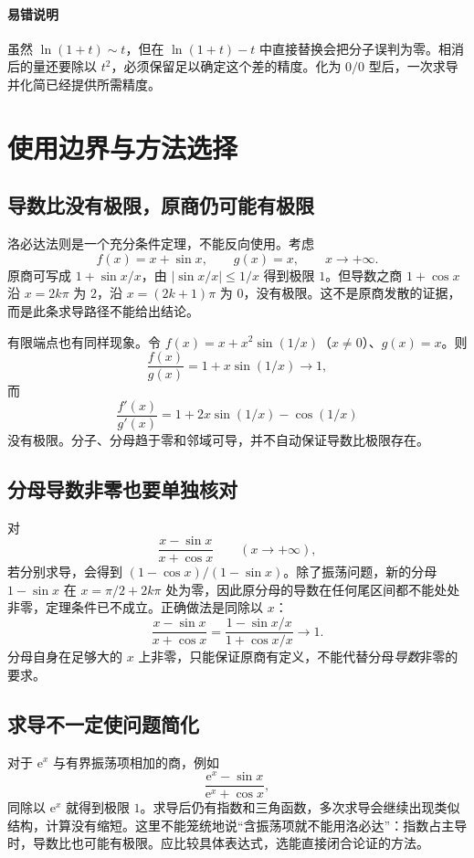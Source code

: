 \documentclass[UTF8,fontset=fandol,12pt,oneside,openany]{ctexrep}
\newcommand{\ee}{\mathrm e}
\theoremstyle{definition}
\begin{document}
\paragraph{易错说明}
虽然 $\ln(1+t)\sim t$，但在 $\ln(1+t)-t$ 中直接替换会把分子误判为零。相消后的量还要除以 $t^2$，必须保留足以确定这个差的精度。化为 $0/0$ 型后，一次求导并化简已经提供所需精度。

\section{使用边界与方法选择}
\label{lec:07:boundaries}

\subsection{导数比没有极限，原商仍可能有极限}

洛必达法则是一个充分条件定理，不能反向使用。考虑
\[
f(x)=x+\sin x,\qquad g(x)=x,\qquad x\to+\infty.
\]
原商可写成 $1+\sin x/x$，由 $|\sin x/x|\le1/x$ 得到极限 $1$。但导数之商 $1+\cos x$ 沿 $x=2k\pi$ 为 $2$，沿 $x=(2k+1)\pi$ 为 $0$，没有极限。这不是原商发散的证据，而是此条求导路径不能给出结论。

有限端点也有同样现象。令 $f(x)=x+x^2\sin(1/x)$（$x\ne0$）、$g(x)=x$。则
\[
\frac{f(x)}{g(x)}=1+x\sin(1/x)\to1,
\]
而
\[
\frac{f'(x)}{g'(x)}
=1+2x\sin(1/x)-\cos(1/x)
\]
没有极限。分子、分母趋于零和邻域可导，并不自动保证导数比极限存在。

\subsection{分母导数非零也要单独核对}

对
\[
\frac{x-\sin x}{x+\cos x}\qquad(x\to+\infty),
\]
若分别求导，会得到 $(1-\cos x)/(1-\sin x)$。除了振荡问题，新的分母 $1-\sin x$ 在 $x=\pi/2+2k\pi$ 处为零，因此原分母的导数在任何尾区间都不能处处非零，定理条件已不成立。正确做法是同除以 $x$：
\[
\frac{x-\sin x}{x+\cos x}
=\frac{1-\sin x/x}{1+\cos x/x}\to1.
\]
分母自身在足够大的 $x$ 上非零，只能保证原商有定义，不能代替分母\emph{导数}非零的要求。

\subsection{求导不一定使问题简化}

对于 $\ee^x$ 与有界振荡项相加的商，例如
\[
\frac{\ee^x-\sin x}{\ee^x+\cos x},
\]
同除以 $\ee^x$ 就得到极限 $1$。求导后仍有指数和三角函数，多次求导会继续出现类似结构，计算没有缩短。这里不能笼统地说“含振荡项就不能用洛必达”：指数占主导时，导数比也可能有极限。应比较具体表达式，选能直接闭合论证的方法。
\end{document}
